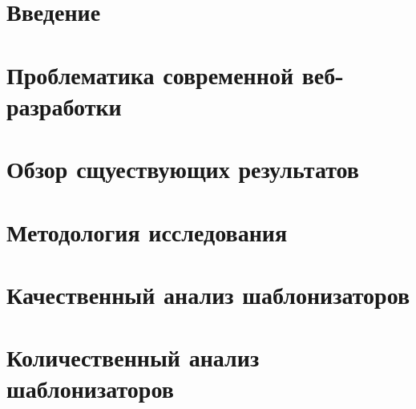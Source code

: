 







\tableofcontents

\section*{Введение}




\section{Проблематика современной веб-разработки}


\section{Обзор сщуествующих результатов}


\section{Методология исследования}


\section{Качественный анализ шаблонизаторов}


\section{Количественный анализ шаблонизаторов}


